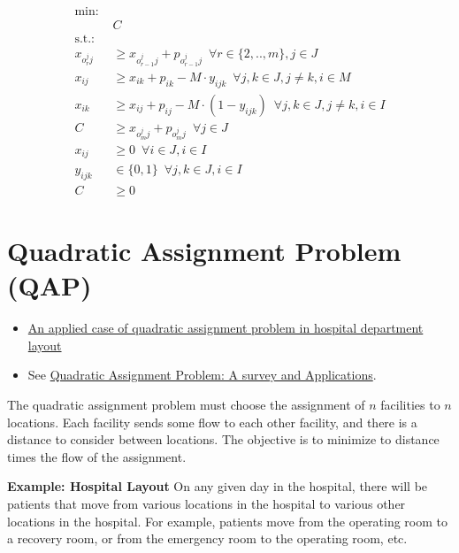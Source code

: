 \begin{align}\textrm{min: }  &  \\
               & C \\
\textrm{s.t.: } &  \\
               x_{o^{j}_{r}j} &  \geq x_{o^{j}_{r-1}j} +p_{o^{j}_{r-1}j} \,\,\, \forall r \in \{2,..,m\}, j \in {J} \\
                   x_{ij}     & \geq x_{ik} + p_{ik} - M \cdot y_{ijk} \,\,\, \forall j,k \in {J}, j \neq k, i \in {M} \\
                   x_{ik}     & \geq x_{ij} + p_{ij} - M \cdot (1-y_{ijk}) \,\,\, \forall j,k \in {J}, j \neq k,i \in {I} \\
                   C          & \geq x_{o^{j}_{m}j} + p_{o^{j}_{m}j} \,\,\, \forall j \in {J} \\
                  x_{ij}      & \geq 0 \,\,\, \forall i \in {J}, i \in {I} \\
                  y_{ijk}     & \in \{0,1\} \,\,\, \forall j,k \in {J}, i \in {I} \\
                  C & \geq 0
              \end{align}



\section{Quadratic Assignment Problem (QAP)}
\begin{resource}{}{}
\begin{itemize}
\item \href{https://ieeexplore-ieee-org.ezproxy.lib.vt.edu/stamp/stamp.jsp?tp=&arnumber=7170278}{An applied case of quadratic assignment problem in hospital department layout}
\item See \href{https://www.semanticscholar.org/paper/Quadratic-Assignment-Problem%3A-A-survey-and-Shawky-Metwally/247b45613d6d3b6961fdad44f9e7fefb70fd3e82}{Quadratic Assignment Problem: A survey and Applications}.
\end{itemize}
\end{resource}
The quadratic assignment problem must choose the assignment of $n$ facilities to $n$ locations.  Each facility sends some flow to each other facility, and there is a distance to consider between locations.   
The objective is to minimize to distance times the flow of the assignment.


\textbf{Example:  Hospital Layout}
On any given day in the hospital, there will be patients that move from various locations in the hospital to various other locations in the hospital.  For example, patients move from the operating room to a recovery room, or from the emergency room to the operating room, etc.

